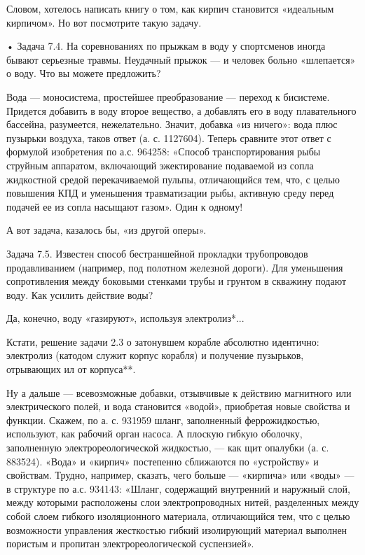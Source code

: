 Словом,  хотелось   написать  книгу  о  том,   как  кирпич  становится
«идеальным кирпичом». Но вот посмотрите такую задачу.

•  Задача  7.4. На  соревнованиях  по  прыжкам  в воду  у  спортсменов
иногда бывают  серьезные травмы. Неудачный  прыжок — и  человек больно
«шлепается» о воду. Что вы можете предложить?

Вода —  моносистема, простейшее преобразование —  переход к бисистеме.
Придется  добавить в  воду второе  вещество,  а добавлять  его в  воду
плавательного  бассейна,  разумеется,  нежелательно.  Значит,  добавка
«из  ничего»:  вода   плюс  пузырьки  воздуха,  таков   ответ  (а.  с.
1127604). Теперь  сравните этот ответ  с формулой изобретения  по а.с.
964258: «Способ транспортирования  рыбы струйным аппаратом, включающий
эжектирование  подаваемой из  сопла  жидкостной средой  перекачиваемой
пульпы,  отличающийся тем,  что, с  целью повышения  КПД и  уменьшения
травматизации рыбы, активную среду перед  подачей ее из сопла насыщают
газом». Один к одному!

А вот задача, казалось бы, «из другой оперы».


Задача  7.5.  Известен  способ бестраншейной  прокладки  трубопроводов
продавливанием   (например,  под   полотном   железной  дороги).   Для
уменьшения  сопротивления между  боковыми стенками  трубы и  грунтом в
скважину подают воду. Как усилить действие воды?

Да, конечно, воду «газируют», используя электролиз*...

Кстати, решение  задачи 2.3 о затонувшем  корабле абсолютно идентично:
электролиз  (катодом служит  корпус  корабля)  и получение  пузырьков,
отрывающих ил от корпуса**.

Ну а дальше  — всевозможные добавки, отзывчивые  к действию магнитного
или электрического полей, и  вода становится «водой», приобретая новые
свойства  и  функции.  Скажем,  по а.  с.  931959  шланг,  заполненный
феррожидкостью,  используют,  как  рабочий  орган  насоса.  А  плоскую
гибкую оболочку, заполненную электрореологической жидкостью, — как щит
опалубки (а.  с. 883524). «Вода»  и «кирпич» постепенно  сближаются по
«устройству»  и  свойствам.  Трудно, например,  сказать,  чего  больше
—  «кирпича»  или  «воды»  —  в  структуре  по  а.с.  934143:  «Шланг,
содержащий  внутренний и  наружный  слой,  между которыми  расположены
слои  электропроводных нитей,  разделенных между  собой слоем  гибкого
изоляционного  материала, отличающийся  тем, что  с целью  возможности
управления жесткостью гибкий изолирующий  материал выполнен пористым и
пропитан электрореологической суспензией».

